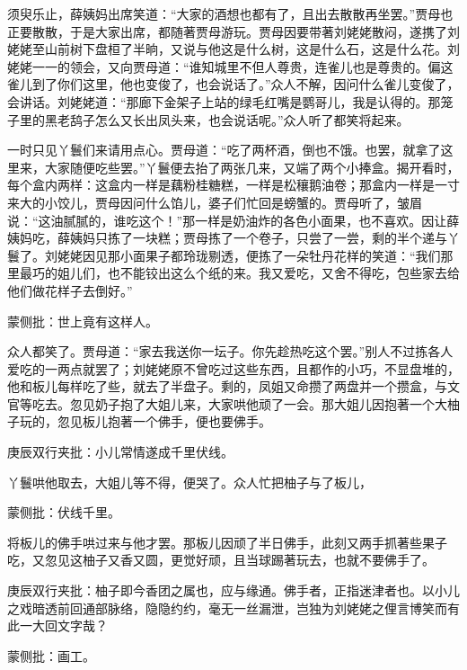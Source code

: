 \begin{parag}


    须臾乐止，薛姨妈出席笑道：“大家的酒想也都有了，且出去散散再坐罢。”贾母也正要散散，于是大家出席，都随著贾母游玩。贾母因要带著刘姥姥散闷，遂携了刘姥姥至山前树下盘桓了半晌，又说与他这是什么树，这是什么石，这是什么花。刘姥姥一一的领会，又向贾母道：“谁知城里不但人尊贵，连雀儿也是尊贵的。偏这雀儿到了你们这里，他也变俊了，也会说话了。”众人不解，因问什么雀儿变俊了，会讲话。刘姥姥道：“那廊下金架子上站的绿毛红嘴是鹦哥儿，我是认得的。那笼子里的黑老鸹子怎么又长出凤头来，也会说话呢。”众人听了都笑将起来。
\end{parag}


\begin{parag}


    一时只见丫鬟们来请用点心。贾母道：“吃了两杯酒，倒也不饿。也罢，就拿了这里来，大家随便吃些罢。”丫鬟便去抬了两张几来，又端了两个小捧盒。揭开看时，每个盒内两样：这盒内一样是藕粉桂糖糕，一样是松穰鹅油卷；那盒内一样是一寸来大的小饺儿，贾母因问什么馅儿，婆子们忙回是螃蟹的。贾母听了，皱眉说：“这油腻腻的，谁吃这个！”那一样是奶油炸的各色小面果，也不喜欢。因让薛姨妈吃，薛姨妈只拣了一块糕；贾母拣了一个卷子，只尝了一尝，剩的半个递与丫鬟了。刘姥姥因见那小面果子都玲珑剔透，便拣了一朵牡丹花样的笑道：“我们那里最巧的姐儿们，也不能铰出这么个纸的来。我又爱吃，又舍不得吃，包些家去给他们做花样子去倒好。”\begin{note}蒙侧批：世上竟有这样人。\end{note}众人都笑了。贾母道：“家去我送你一坛子。你先趁热吃这个罢。”别人不过拣各人爱吃的一两点就罢了；刘姥姥原不曾吃过这些东西，且都作的小巧，不显盘堆的，他和板儿每样吃了些，就去了半盘子。剩的，凤姐又命攒了两盘并一个攒盒，与文官等吃去。忽见奶子抱了大姐儿来，大家哄他顽了一会。那大姐儿因抱著一个大柚子玩的，忽见板儿抱著一个佛手，便也要佛手。\begin{note}庚辰双行夹批：小儿常情遂成千里伏线。\end{note}丫鬟哄他取去，大姐儿等不得，便哭了。众人忙把柚子与了板儿，\begin{note}蒙侧批：伏线千里。\end{note}将板儿的佛手哄过来与他才罢。那板儿因顽了半日佛手，此刻又两手抓著些果子吃，又忽见这柚子又香又圆，更觉好顽，且当球踢著玩去，也就不要佛手了。\begin{note}庚辰双行夹批：柚子即今香团之属也，应与缘通。佛手者，正指迷津者也。以小儿之戏暗透前回通部脉络，隐隐约约，毫无一丝漏泄，岂独为刘姥姥之俚言博笑而有此一大回文字哉？\end{note}\begin{note}蒙侧批：画工。\end{note}
\end{parag}


